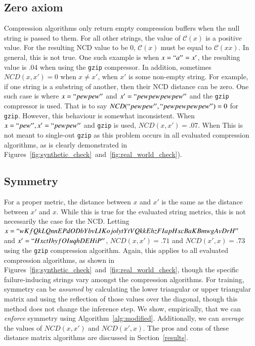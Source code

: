 \documentclass[preprint,12pt]{elsarticle}
\begin{document}
\subsection{Zero axiom}
Compression algorithms only return empty compression buffers when the null string is passed to them.
For all other strings, the value of $\mathcal{C}(x)$ is a positive value.
For the resulting NCD value to be 0, $\mathcal{C}(x)$ must be equal to $\mathcal{C}(xx)$.
In general, this is not true.
One such example is when $x = ``a'' = x'$, the resulting value is .04 when using the \texttt{gzip} compressor.
In addition, sometimes $NCD(x,x') = 0$ when $x\neq x'$, when $x'$ is some non-empty string.
For example, if one string is a substring of another, then their NCD distance can be zero.
One such case is where $x = ``pewpew''$ and $x' = ``pewpewpewpew''$ and the \texttt{gzip} compressor is used.
That is to say $NCD(``pewpew'', ``pewpewpewpew'') = 0$ for \texttt{gzip}.
However, this behaviour is somewhat inconsistent.
When $x= ``pew'', x' =``pewpew''$ and \texttt{gzip} is used, $NCD(x,x') = .07$.
When
This is not meant to single-out \texttt{gzip} as this problem occurs in all evaluated compression algorithms, as is clearly demonstrated in Figures~\ref{fig:synthetic_check}~and~\ref{fig:real_world_check}).




\subsection{Symmetry}
For a proper metric, the distance between $x$ and $x'$ is the same as the distance between $x'$ and $x$.
While this is true for the evaluated string metrics, this is not necessarily the case for the NCD.
Letting $x = ``wKfQkLQnnEPdODbYbvLIKojolytYtVQkkEhzFIapHxcBaKBmwgAvDrH''$ and $x' = ``HxctIhyfOIuqhDEHiP''$, $NCD(x,x') = .71$ and $NCD(x',x) = .73$ using the \texttt{gzip} compression algorithm.
Again, this applies to all evaluated compression algorithms, as shown in Figures~\ref{fig:synthetic_check}~and~\ref{fig:real_world_check}, though the specific failure-inducing strings vary amongst the compression algorithms.
For training, symmetry can be \textit{assumed} by calculating the lower triangular or upper triangular matrix and using the reflection of those values over the diagonal, though this method does not change the inference step.
We show, empirically, that we can \textit{enforce} symmetry using Algorithm~\ref{alg:modified}.
Additionally, we can \textit{average} the values of $NCD(x,x')$ and $NCD(x',x)$.
The pros and cons of these distance matrix algorithms are discussed in Section~\ref{results}.
\end{document}
